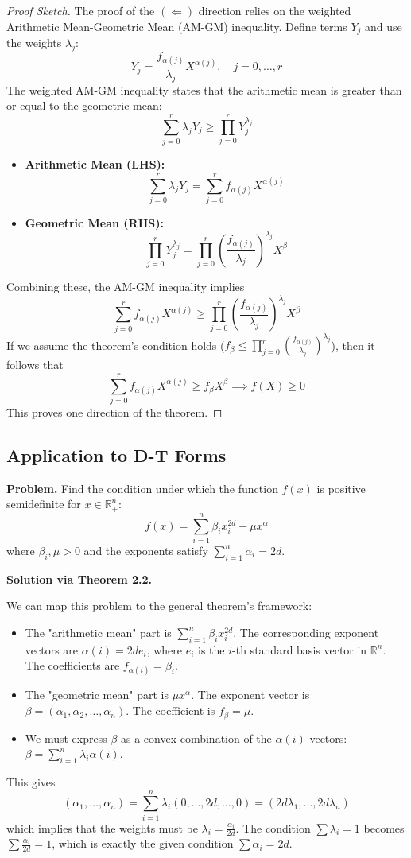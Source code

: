 \documentclass{article}
\begin{document}
\begin{proof}[Proof Sketch]
The proof of the $(\Leftarrow)$ direction relies on the weighted Arithmetic Mean-Geometric Mean (AM-GM) inequality. 
Define terms $Y_j$ and use the weights $\lambda_j$:
\[
   Y_j = \frac{f_{\alpha(j)}}{\lambda_j} X^{\alpha(j)}, \quad j = 0, \dots, r
\]
The weighted AM-GM inequality states that the arithmetic mean is greater than or equal to the geometric mean:
\[
   \sum_{j=0}^r \lambda_j Y_j \geq \prod_{j=0}^r Y_j^{\lambda_j}
\]
\begin{itemize}
   \item \textbf{Arithmetic Mean (LHS):}
   \[
      \sum_{j=0}^r \lambda_j Y_j = \sum_{j=0}^r f_{\alpha(j)} X^{\alpha(j)}
   \]
   \item \textbf{Geometric Mean (RHS):}
   \[
      \prod_{j=0}^r Y_j^{\lambda_j} = \prod_{j=0}^r \left( \frac{f_{\alpha(j)}}{\lambda_j} \right)^{\lambda_j} X^{\beta}
   \]
\end{itemize}
Combining these, the AM-GM inequality implies
\[
   \sum_{j=0}^r f_{\alpha(j)} X^{\alpha(j)} \geq \prod_{j=0}^r \left( \frac{f_{\alpha(j)}}{\lambda_j} \right)^{\lambda_j} X^{\beta}
\]
If we assume the theorem's condition holds ($f_{\beta} \leq \prod_{j=0}^r (\frac{f_{\alpha(j)}}{\lambda_j})^{\lambda_j}$), 
then it follows that
\[
   \sum_{j=0}^r f_{\alpha(j)} X^{\alpha(j)} \geq f_{\beta} X^{\beta} \implies f(X) \geq 0
\]
This proves one direction of the theorem.
\end{proof}


\subsection*{Application to D-T Forms}
	\textbf{Problem.} Find the condition under which the function $f(x)$ is positive semidefinite for $x \in \mathbb{R}_+^n$:
\[
   f(x) = \sum_{i=1}^n \beta_i x_i^{2d} - \mu x^{\alpha}
\]
where $\beta_i, \mu > 0$ and the exponents satisfy $\sum_{i=1}^n \alpha_i = 2d$.

	\textbf{Solution via Theorem 2.2.}

We can map this problem to the general theorem's framework:
\begin{itemize}
   \item The "arithmetic mean" part is $\sum_{i=1}^n \beta_i x_i^{2d}$. The corresponding exponent vectors are $\alpha(i) = 2d e_i$, where $e_i$ is the $i$-th standard basis vector in $\mathbb{R}^n$. The coefficients are $f_{\alpha(i)} = \beta_i$.
   \item The "geometric mean" part is $\mu x^{\alpha}$. The exponent vector is $\beta = (\alpha_1, \alpha_2, \dots, \alpha_n)$. 
   The coefficient is $f_{\beta} = \mu$.
   \item We must express $\beta$ as a convex combination of the $\alpha(i)$ vectors: $\beta = \sum_{i=1}^n \lambda_i \alpha(i)$.
\end{itemize}
This gives
\[
   (\alpha_1, \dots, \alpha_n) = \sum_{i=1}^n \lambda_i (0, \dots, 2d, \dots, 0) = (2d \lambda_1, \dots, 2d \lambda_n)
\]
which implies that the weights must be $\lambda_i = \frac{\alpha_i}{2d}$.
The condition $\sum \lambda_i = 1$ becomes $\sum \frac{\alpha_i}{2d} = 1$, which is exactly the given condition 
$\sum \alpha_i = 2d$.
\end{document}
